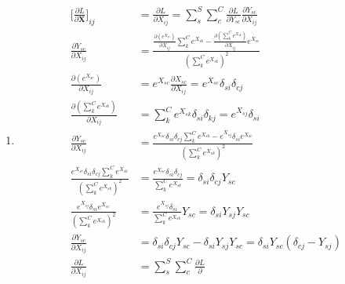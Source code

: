 \documentclass[11pt]{article}
\begin{document}
\begin{enumerate}[label=1\alph*]
\item
  \begin{align*}
  {\Big[\frac{\partial L}{\partial \mathbf{X}}\Big]}_{ij} &=\frac{\partial L}{\partial X_{ij}} =
                                              \sum_s^S \sum_c^C \frac{\partial L}{\partial
                                              Y_{sc}}\frac{\partial Y_{sc}}{\partial
                                              X_{ij}} \\
 \frac{\partial Y_{sc}}{\partial X_{ij}} &= \frac{\frac{\partial (e^{X_{sc}})}{\partial
                             X_{ij}}\sum_k^C e^{X_{sk}}-\frac{\partial (\sum_k^C
                             e^{X_{sk}})}{\partial X_{ij}}e^{X_{sc}}}{{(\sum_k^C
                             e^{X_{sk}})}^2} \\
    \frac{\partial (e^{X_{sc}})}{\partial X_{ij}} &= e^{X_{sc}}\frac{\partial X_{sc}}{\partial
                                      X_{ij}} =
                                      e^{X_{sc}}\delta_{si}\delta_{cj}\\
    \frac{\partial (\sum_k^C e^{X_{sk}})}{\partial X_{ij}} &= \sum_k^C
                                            e^{X_{sk}}\delta_{si}\delta_{kj} =
                                            e^{X_{sj}}\delta_{si}\\
    \frac{\partial Y_{sc}}{\partial X_{ij}} &=
                                \frac{e^{X_{sc}}\delta_{si}\delta_{cj}\sum_k^C
                                e^{X_{sk}}-e^{X_{sj}}\delta_{si}e^{X_{sc}}}{{(\sum_k^C
                                e^{X_{sk}})}^2} \\
    \frac{e^{X_{sc}}\delta_{si}\delta_{cj}\sum_k^C e^{X_{sk}}}{{(\sum_k^C
    e^{X_{sk}})}^2} &= \frac{e^{X_{sc}}\delta_{si}\delta_{cj}}{\sum_k^C e^{X_{sk}}}
                      = \delta_{si}\delta_{cj}Y_{sc} \\
    \frac{e^{X_{sj}}\delta_{si}e^{X_{sc}}}{{(\sum_k^C e^{X_{sk}})}^2} &=
                                                                \frac{e^{X_{sj}}\delta_{si}}{{\sum_k^C
                                                                e^{X_{sk}}}}Y_{sc}
                                                                =
                                                                \delta_{si}Y_{sj}Y_{sc}\\
    \frac{\partial Y_{sc}}{\partial X_{ij}} &=
                                \delta_{si}\delta_{cj}Y_{sc}-\delta_{si}Y_{sj}Y_{sc}=
                                \delta_{si}Y_{sc}(\delta_{cj} - Y_{sj})\\
    \frac{\partial L}{\partial X_{ij}} &= \sum_s^S \sum_c^C \frac{\partial L}{\partial
}
\end{align*}
\end{enumerate}
\end{document}
